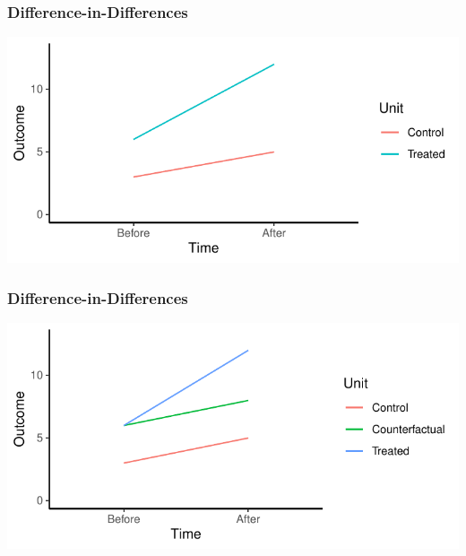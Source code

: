 \documentclass[xcolor=x11names,compress]{beamer}\usepackage[]{graphicx}\usepackage[]{xcolor}
\makeatletter
\def\maxwidth{ %
  \ifdim\Gin@nat@width>\linewidth
    \linewidth
  \else
    \Gin@nat@width
  \fi
}
\newenvironment{knitrout}{}{} %
\renewcommand{\(}{\begin{columns}}
\renewcommand{\)}{\end{columns}}
\newcommand{\<}[1]{\begin{column}{#1}}
\renewcommand{\>}{\end{column}}
\makeatother
\begin{document}
\begin{frame}
\frametitle{Difference-in-Differences}
\begin{knitrout}
\color{fgcolor}
\includegraphics[width=\maxwidth]{figure/DinD_chart1b-1} 
\end{knitrout}
\end{frame}

\begin{frame}
\frametitle{Difference-in-Differences}
\begin{knitrout}
\color{fgcolor}
\includegraphics[width=\maxwidth]{figure/DinD_chart1c-1} 
\end{knitrout}
\end{frame}
\end{document}
